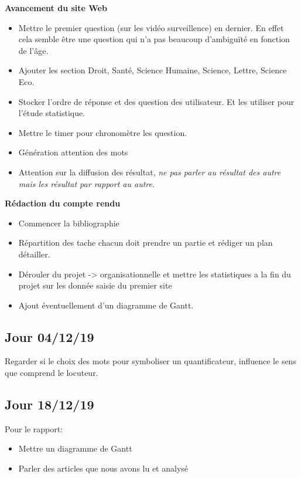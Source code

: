 \documentclass[11pt,letterpaper]{article}
\begin{document}
\textbf{Avancement du site Web }
\begin{itemize}
\item Mettre le premier question (sur les vidéo surveillence) en dernier. En effet cela semble être une question qui n'a pas beaucoup d'ambiguïté en fonction de l'âge.
\item Ajouter les section  Droit, Santé, Science Humaine, Science, Lettre, Science Eco.
\item Stocker l'ordre de réponse et des question des utilisateur. Et les utiliser pour l'étude statistique.
\item Mettre le timer pour chronomètre les question.
\item Génération attention des mots
\item  Attention sur la diffusion des résultat, \textit{ne pas parler au résultat des autre mais les résultat par rapport au autre}.
\end{itemize}
\textbf{Rédaction du compte rendu}
\begin{itemize}
\item Commencer la bibliographie
\item Répartition des tache chacun doit prendre un partie et rédiger un plan détailler.
\item Dérouler du projet -> organisationnelle et mettre les statistiques a la fin du projet sur les donnée saisie du premier site
\item Ajout éventuellement d'un diagramme de Gantt.
\end{itemize}

\newpage
\subsection{Jour 04/12/19}
Regarder si le choix des mots pour symboliser un quantificateur, influence le sens que comprend le locuteur.
\vspace{5mm}

\newpage
\subsection{Jour 18/12/19}
Pour le rapport:
\begin{itemize}
    \item Mettre un diagramme de Gantt
    \item Parler des articles que nous avons lu et analysé
\end{itemize}{} \vspace{5mm}
\end{document}

